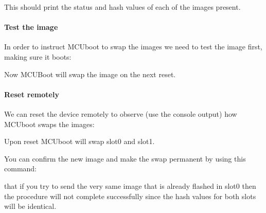 \documentclass[letterpaper,10pt,english]{sphinxmanual}
\begin{document}
This should print the status and hash values of each of the images present.


\paragraph{Test the image}
\label{\detokenize{fota/smp_svr:test-the-image}}
In order to instruct MCUboot to swap the images we need to test the image first,
making sure it boots:

\begin{sphinxVerbatim}[commandchars=\\\{\}]
\end{sphinxVerbatim}

Now MCUBoot will swap the image on the next reset.


\paragraph{Reset remotely}
\label{\detokenize{fota/smp_svr:reset-remotely}}
We can reset the device remotely to observe (use the console output) how
MCUboot swaps the images:

\begin{sphinxVerbatim}[commandchars=\\\{\}]
\end{sphinxVerbatim}

Upon reset MCUboot will swap slot\sphinxhyphen{}0 and slot\sphinxhyphen{}1.

You can confirm the new image and make the swap permanent by using this command:

\begin{sphinxVerbatim}[commandchars=\\\{\}]
\end{sphinxVerbatim}

 that if you try to send the very same image that is already flashed in
slot\sphinxhyphen{}0 then the procedure will not complete successfully since the hash values
for both slots will be identical.
\end{document}
